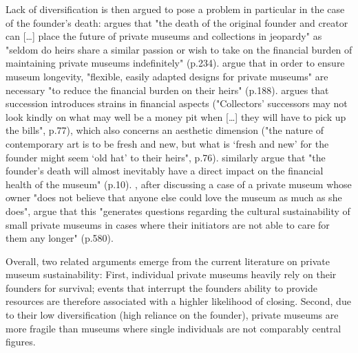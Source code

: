 \documentclass[12pt]{article}
\begin{document}
Lack of diversification is then argued to pose a problem in particular in the case of the founder's death:
\textcite{Walker_2019_collector} argues that "the death of the original founder and creator can [\ldots{}] place the future of private museums and collections in jeopardy" as "seldom do heirs share a similar passion or wish to take on the financial burden of maintaining private museums indefinitely" (p.234). 
\textcite{Bechtler_Imhof_2018_future} argue that in order to ensure museum longevity, "flexible, easily adapted designs for private museums" are necessary "to reduce the financial burden on their heirs" (p.188).
\textcite{Adam_2021_rise} argues that succession introduces strains in financial aspects ("Collectors’ successors may not look kindly on what may well be a money pit when [\ldots{}] they will have to pick up the bills", p.77), which also concerns an aesthetic dimension ("the nature of contemporary art is to be fresh and new, but what is ‘fresh and new’ for the founder might seem ‘old hat’ to their heirs", p.76).
\textcite{Velthuis_Gera_2024_fragility} similarly argue that "the founder’s death will almost inevitably have a direct impact on the financial health of the museum" (p.10).
\cite{StylianouLambert_etal_2014_museums}, after discussing a case of a private museum whose owner "does not believe that anyone else could love the museum as much as she does", argue that this "generates questions regarding the cultural sustainability of small private museums in cases where their initiators are not able to care for them any longer" (p.580).



Overall, two related arguments emerge from the current literature on private museum sustainability:
First, individual private museums heavily rely on their founders for survival; events that interrupt the founders ability to provide resources are therefore associated with a highler likelihood of closing.
Second, due to their low diversification (high reliance on the founder), private museums are more fragile than museums where single individuals are not comparably central figures.
\end{document}
